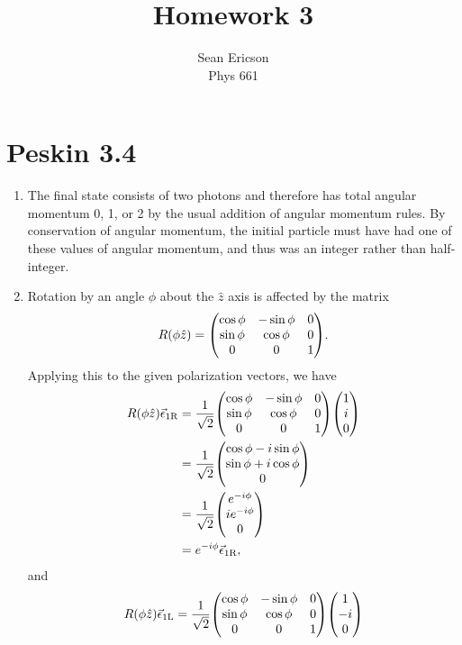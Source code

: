 \documentclass[12pt]{article}
\begin{document}
\title{Homework 3}
\author{Sean Ericson \\ Phys 661}
\maketitle

\section*{Peskin 3.4}
\begin{enumerate}[label=(\alph*)]
    \item The final state consists of two photons and therefore has total angular momentum 0, 1, or 2 by the usual addition of angular momentum rules. By conservation of angular momentum, the initial particle must have had one of these values of angular momentum, and thus was an integer rather than half-integer.
    \item Rotation by an angle $\phi$ about the $\hat{z}$ axis is affected by the matrix
    \[ R(\phi\hat{z}) = \mqty(\cos\phi & -\sin\phi & 0 \\ \sin\phi & \cos\phi & 0 \\ 0 & 0 & 1). \]
    Applying this to the given polarization vectors, we have
    \begin{align*}
        R(\phi\hat{z})\vec{\epsilon}_{1\text{R}} &= \frac{1}{\sqrt{2}}\mqty(\cos\phi & -\sin\phi & 0 \\ \sin\phi & \cos\phi & 0 \\ 0 & 0 & 1)\mqty(1\\i\\0) \\
        &= \frac{1}{\sqrt{2}}\mqty(\cos\phi - i\sin\phi \\ \sin\phi + i\cos\phi \\ 0) \\
        &= \frac{1}{\sqrt{2}}\mqty(e^{-i\phi} \\ ie^{-i\phi} \\ 0) \\
        &= e^{-i\phi}\vec{\epsilon}_{1\text{R}},
    \end{align*}
    and 
    \begin{align*}
        R(\phi\hat{z})\vec{\epsilon}_{1\text{L}} &= \frac{1}{\sqrt{2}}\mqty(\cos\phi & -\sin\phi & 0 \\ \sin\phi & \cos\phi & 0 \\ 0 & 0 & 1)\mqty(1\\-i\\0) \\

\end{align*}
\end{enumerate}
\end{document}
